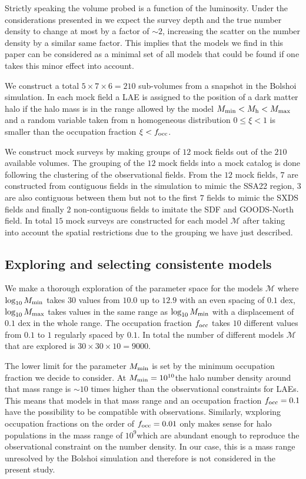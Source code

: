 \documentclass{emulateapj}
\newcommand{\ly}{{\ifmmode{{\rm Ly}\alpha}\else{Ly$\alpha$~}\fi}}
\newcommand{\hMsun}{{\ifmmode{h^{-1}{\rm
        {M_{\odot}}}}\else{$h^{-1}{\rm{M_{\odot}}}$}\fi}}
\begin{document}
Strictly speaking the volume probed is a function of the \ly
luminosity. Under the considerations presented in \citep{Gronwall07}
we expect the survey depth and the true number density to change at
most by a factor of $\sim2$, increasing the scatter on the
number density by a similar same factor. This implies that the models we
find in this paper can be considered as a minimal set of all models
that could be found if one takes this minor effect into account.

We construct a total $5\times 7 \times 6=210$ sub-volumes from a snapshot in the Bolshoi
simulation. In each mock field a LAE is assigned to the position of a
dark matter halo if the halo mass is in the range allowed by the model
$M_{\rm min}<M_{\rm h}<M_{\rm max}$ and a random variable taken from n
homogeneous distribution $0\leq \xi<1$ is smaller than the occupation
fraction $\xi<f_{\rm occ}$. 

We construct mock surveys by making groups of $12$ mock fields
out of the $210$ available volumes.  The grouping of the $12$
mock fields into a mock catalog is done following the clustering of the
observational fields. From the $12$ mock fields, $7$ are constructed
from contiguous fields in the simulation to mimic the SSA22 region,
$3$ are also contiguous between them but not to the first $7$ fields
to mimic the SXDS fields and finally $2$ non-contiguous fields to
imitate the SDF and GOODS-North field.   In total $15$ mock surveys are
constructed for each model $\mathcal{M}$ after taking into account the
spatial restrictions due to the grouping we have just described.

\subsection{Exploring and selecting consistente models}

We make a thorough exploration of the parameter space for the models
${\mathcal M}$ where $\log_{10} M_{\rm min}$ takes $30$ values from $10.0$ up
to $12.9$ with an even spacing of $0.1$ dex, $\log_{10} M_{\rm max}$
takes values in the same range as $\log_{10}M_{\rm min}$ with a
displacement of $0.1$ dex in the whole range. The occupation fraction
$f_{\rm occ}$ takes $10$ different values from $0.1$ to $1$ regularly
spaced by $0.1$. In total the number of different models ${\mathcal
  M}$ that are explored is $30 \times 30 \times 10 = 9000$.  

The lower limit for the parameter $M_{\rm min}$ is set by the minimum
occupation fraction we decide to consider. At $M_{\rm
  min}=10^{10}$\hMsun the halo number density around that mass range
is $\sim 10$ times higher than the observational constraints
for LAEs. This means that models in that mass range and an occupation
fraction $f_{\rm  occ}=0.1$ have the possibility to be compatible with
observations.  Similarly, wxploring occupation fractions on the order
of $f_{\rm occ}=0.01$ only makes sense for halo populations in the
mass range of $10^{9}$\hMsun which are abundant enough to reproduce
the observational constraint on the number density. In our case, this
is a mass range unresolved by the Bolshoi simulation and therefore
is not considered in the present study. 
\end{document}
